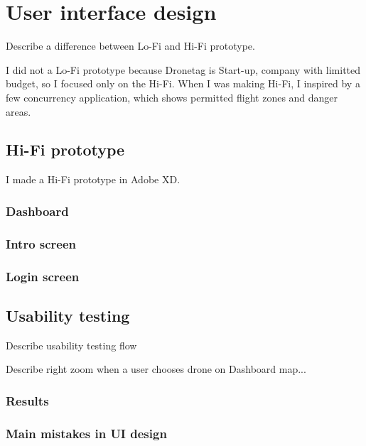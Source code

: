 \chapter{User interface design}\label{ch:user-interface-design}

Describe a difference between Lo-Fi and Hi-Fi prototype.

I did not a Lo-Fi prototype because Dronetag is Start-up, company with limitted budget, so I focused only on the Hi-Fi. When I was making Hi-Fi, I inspired by a few concurrency application, which shows permitted flight zones and danger areas.
\section{Hi-Fi prototype}\label{sec:hi-fi-prototype}
I made a Hi-Fi prototype in Adobe XD.

\subsection{Dashboard}\label{subsec:dashboard2}

\subsection{Intro screen}\label{subsec:intro-screen}

\subsection{Login screen}\label{subsec:login-screen}

\section{Usability testing}\label{sec:usability-testing}
Describe usability testing flow

Describe right zoom when a user chooses drone on Dashboard map...

\subsection{Results}\label{subsec:results}

\subsection{Main mistakes in UI design}\label{subsec:main-mistakes-in-ui-design}
